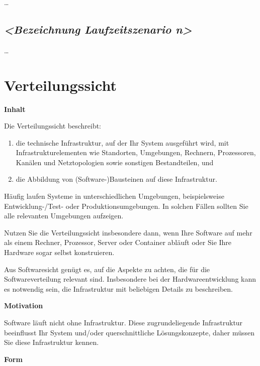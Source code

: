 \documentclass[
]{article}
\begin{document}
\ldots{}

\hypertarget{__emphasis_bezeichnung_laufzeitszenario_n_emphasis}{%
\subsection{\texorpdfstring{\emph{\textless Bezeichnung Laufzeitszenario
n\textgreater{}}}{\textless Bezeichnung Laufzeitszenario n\textgreater{}}}\label{__emphasis_bezeichnung_laufzeitszenario_n_emphasis}}

\ldots{}

\hypertarget{section-deployment-view}{%
\section{Verteilungssicht}\label{section-deployment-view}}

\textbf{Inhalt}

Die Verteilungssicht beschreibt:

\begin{enumerate}
\def\labelenumi{\arabic{enumi}.}
\item
  die technische Infrastruktur, auf der Ihr System ausgeführt wird, mit
  Infrastrukturelementen wie Standorten, Umgebungen, Rechnern,
  Prozessoren, Kanälen und Netztopologien sowie sonstigen Bestandteilen,
  und
\item
  die Abbildung von (Software-)Bausteinen auf diese Infrastruktur.
\end{enumerate}

Häufig laufen Systeme in unterschiedlichen Umgebungen, beispielsweise
Entwicklung-/Test- oder Produktionsumgebungen. In solchen Fällen sollten
Sie alle relevanten Umgebungen aufzeigen.

Nutzen Sie die Verteilungssicht insbesondere dann, wenn Ihre Software
auf mehr als einem Rechner, Prozessor, Server oder Container abläuft
oder Sie Ihre Hardware sogar selbst konstruieren.

Aus Softwaresicht genügt es, auf die Aspekte zu achten, die für die
Softwareverteilung relevant sind. Insbesondere bei der
Hardwareentwicklung kann es notwendig sein, die Infrastruktur mit
beliebigen Details zu beschreiben.

\textbf{Motivation}

Software läuft nicht ohne Infrastruktur. Diese zugrundeliegende
Infrastruktur beeinflusst Ihr System und/oder querschnittliche
Lösungskonzepte, daher müssen Sie diese Infrastruktur kennen.

\textbf{Form}
\end{document}
